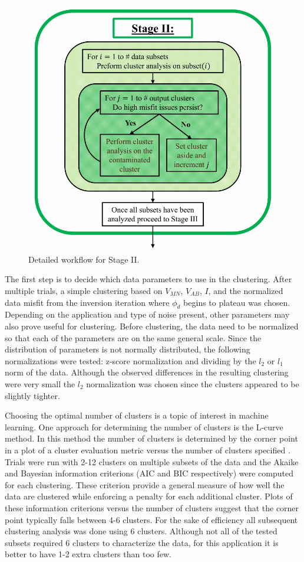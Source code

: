 \documentclass[final,authoryear,5p,times,twocolumn]{elsarticle}
\begin{document}
\begin{figure} [!ht]
\begin{center}
   \includegraphics[trim=0cm 0cm 0cm 0cm, clip=true,width=0.75\linewidth]{./Figures/Fig11.pdf}
\end{center}
\caption{Detailed workflow for Stage II.}
\label{fig:DataQC_workflow_StageII}
\end{figure}

The first step is to decide which data parameters to use in the clustering. After multiple trials, a simple clustering based on $V_{MN}$, $V_{AB}$, $I$, and the normalized data misfit from the inversion iteration where $\phi_d$ begins to plateau was chosen. Depending on the application and type of noise present, other parameters may also prove useful for clustering. Before clustering, the data need to be normalized so that each of the parameters are on the same general scale. Since the distribution of parameters is not normally distributed, the following normalizations were tested: z-score normalization and dividing by the $l_{2}$ or $l_{1}$ norm of the data. Although the observed differences in the resulting clustering were very small the $l_{2}$ normalization was chosen since the clusters appeared to be slightly tighter.

Choosing the optimal number of clusters is a topic of interest in machine learning. One approach for determining the number of clusters is the L-curve method. In this method the number of clusters is determined by the corner point in a plot of a cluster evaluation metric versus the number of clusters specified \citep{Salvador2004}. Trials were run with 2-12 clusters on multiple subsets of the data and the Akaike and Bayesian information criterions (AIC and BIC respectively) were computed for each clustering. These criterion provide a general measure of how well the data are clustered while enforcing a penalty for each additional cluster. Plots of these information criterions versus the number of clusters suggest that the corner point typically falls between 4-6 clusters. For the sake of efficiency all subsequent clustering analysis was done using 6 clusters. Although not all of the tested subsets required 6 clusters to characterize the data, for this application it is better to have 1-2 extra clusters than too few.
\end{document}
